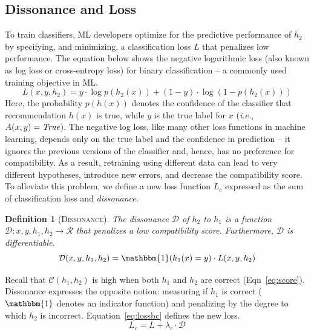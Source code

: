 \documentclass[letterpaper]{article} %
\newcommand{\ie}{\mbox{\it i.e.}}
\newcommand{\?}{\mbox{?}}
\newcommand{\hone}{\mbox{$h_1$}}
\newcommand{\htwo}{\mbox{$h_2$}}
\newcommand{\compatscore}{\mathcal{C}}
\newcommand{\loss}{L}
\newcommand{\lossbc}{\loss_c}
\newcommand{\lambdabc}{\lambda_c}
\newcommand{\dissonance}{\mathcal{D}}
\newtheorem*{definition}{Definition}
\begin{document}
\subsection{Dissonance and Loss}
To train classifiers, ML developers optimize for the predictive performance of $\htwo$
by specifying, and minimizing, a classification loss $\loss$ that penalizes low performance. The equation below shows the negative logarithmic loss (also known as log loss or cross-entropy loss) for binary classification -- a commonly used training objective in ML. 
\begin{equation*}
    \label{eq:logloss}
    \loss(x, y, \htwo) = y \cdot \log p(\htwo(x)) + (1 - y) \cdot \log (1 - p(\htwo(x)))
\end{equation*}
Here, the probability $p(h(x))$ denotes the confidence of the classifier that recommendation $h(x)$ is true, while $y$ is the true label for $x$ (\ie, $A(x, y) = \mbox{\em True}$).
The negative log loss, like many other loss functions in machine learning, depends only on the true label and the confidence in prediction -- it ignores the previous versions of the classifier and, hence, has no preference for compatibility. As a result, retraining using different data can lead to very different hypotheses, introduce new errors, and decrease the compatibility score. 
To alleviate this problem, we define a new loss function $\lossbc$ expressed as the sum of classification loss and {\em dissonance}.

\begin{definition}[\textsc{Dissonance}]
The dissonance $\dissonance$ of $\htwo$ to $\hone$ is a function $\dissonance: x, y, \hone, \htwo \rightarrow \mathcal{R}$ that penalizes a low compatibility score. Furthermore, $\dissonance$ is differentiable.
\begin{equation}
    \label{eq:diss}
    \dissonance(x, y, \hone, \htwo) = \mathbbm{1}(\hone(x) = y) \cdot \loss(x, y, \htwo)
\end{equation}
\end{definition}

\noindent Recall that  $\compatscore(\hone, \htwo)$ is high when both $\hone$ and $\htwo$ are correct (Eqn~\ref{eq:score}).  Dissonance  expresses the opposite notion: measuring if $\hone$ is correct ($\mathbbm{1}$ denotes an indicator function)
and penalizing by the degree to which $\htwo$ is incorrect.
Equation~\ref{eq:lossbc} defines the new loss.
\begin{equation}
    \label{eq:lossbc}
    \lossbc = \loss + \lambdabc \cdot \dissonance
\end{equation}
\end{document}
